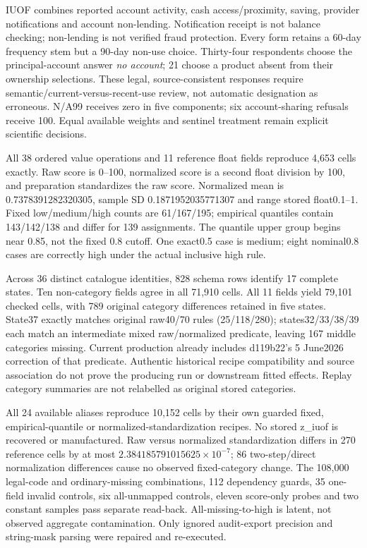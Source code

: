 \documentclass[11pt,a4paper]{article}
\begin{document}
IUOF combines reported account activity, cash access/proximity, saving,
provider notifications and account non-lending. Notification receipt is
not balance checking; non-lending is not verified fraud protection.
Every form retains a 60-day frequency stem but a 90-day non-use choice.
Thirty-four respondents choose the principal-account answer \emph{no account};
21 choose a product absent from their ownership selections. These legal,
source-consistent responses require semantic/current-versus-recent-use
review, not automatic designation as erroneous. N/A99 receives zero in
five components; six account-sharing refusals receive 100. Equal available
weights and sentinel treatment remain explicit scientific decisions.

All 38 ordered value operations and 11 reference float fields reproduce
4,653 cells exactly. Raw score is 0--100, normalized score is a second
float division by 100, and preparation standardizes the raw score.
Normalized mean is 0.7378391282320305, sample SD 0.1871952035771307 and
range stored float0.1--1. Fixed low/medium/high counts are 61/167/195;
empirical quantiles contain 143/142/138 and differ for 139 assignments.
The quantile upper group begins near 0.85, not the fixed 0.8 cutoff.
One exact0.5 case is medium; eight nominal0.8 cases are correctly high
under the actual inclusive high rule.

Across 36 distinct catalogue identities, 828 schema rows identify 17
complete states. Ten non-category fields agree in all 71,910 cells.
All 11 fields yield 79,101 checked cells, with 789 original category
differences retained in five states. State37 exactly matches original
raw40/70 rules (25/118/280); states32/33/38/39 each match an intermediate
mixed raw/normalized predicate, leaving 167 middle categories missing.
Current production already includes d119b22's 5 June2026 correction of
that predicate. Authentic historical recipe compatibility and source
association do not prove the producing run or downstream fitted effects.
Replay category summaries are not relabelled as original stored categories.

All 24 available aliases reproduce 10,152 cells by their own guarded
fixed, empirical-quantile or normalized-standardization recipes.
No stored z\_iuof is recovered or manufactured. Raw versus normalized
standardization differs in 270 reference cells by at most
$2.384185791015625\times10^{-7}$; 86 two-step/direct normalization
differences cause no observed fixed-category change. The 108,000 legal-code
and ordinary-missing combinations, 112 dependency guards, 35 one-field
invalid controls, six all-unmapped controls, eleven score-only probes and
two constant samples pass separate read-back. All-missing-to-high is
latent, not observed aggregate contamination. Only ignored audit-export
precision and string-mask parsing were repaired and re-executed.
\end{document}
